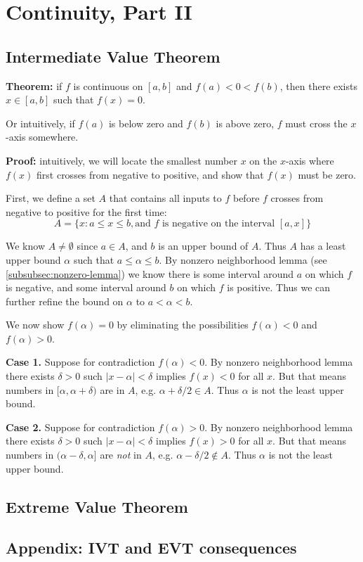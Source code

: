 \section{Continuity, Part II}

\subsection{Intermediate Value Theorem}\label{ivt}
\textbf{Theorem:} if $f$ is continuous on $[a,b]$ and $f(a)<0<f(b)$,
then there exists $x\in[a,b]$ such that $f(x)=0$.

\vs

Or intuitively, if $f(a)$ is below zero and $f(b)$ is above zero, $f$
must cross the $x$-axis somewhere.

\vs

\textbf{Proof:} intuitively, we will locate the smallest number $x$ on
the $x$-axis where $f(x)$ first crosses from negative to positive, and
show that $f(x)$ must be zero.

\vs

First, we define a set $A$ that contains all inputs to $f$ before $f$
crosses from negative to positive for the first time:
\[A=\{x:a\leq x\leq b, \text{and $f$ is negative on the interval
    $[a,x]$}\}\]

We know $A\neq\emptyset$ since $a\in A$, and $b$ is an upper bound of
$A$. Thus $A$ has a least upper bound $\alpha$ such that
$a\leq\alpha\leq b$. By nonzero neighborhood lemma (see
\ref{subsubsec:nonzero-lemma}) we know there is some interval around
$a$ on which $f$ is negative, and some interval around $b$ on which
$f$ is positive. Thus we can further refine the bound on $\alpha$ to
$a<\alpha<b$.

\vs

We now show $f(\alpha)=0$ by eliminating the possibilities
$f(\alpha)<0$ and $f(\alpha)>0$.

\vs

\textbf{Case 1.} Suppose for contradiction $f(\alpha)<0$. By nonzero
neighborhood lemma there exists $\delta>0$ such $|x-\alpha|<\delta$ implies
$f(x)<0$ for all $x$. But that means numbers in $[\alpha, \alpha+\delta)$ are in $A$,
e.g. $\alpha+\delta/2\in A$. Thus $\alpha$ is not the least upper bound.

\vs


\textbf{Case 2.} Suppose for contradiction $f(\alpha)>0$. By nonzero
neighborhood lemma there exists $\delta>0$ such $|x-\alpha|<\delta$ implies
$f(x)>0$ for all $x$. But that means numbers in
$(\alpha-\delta, \alpha]$ are \textit{not} in $A$, e.g.
$\alpha-\delta/2\notin A$. Thus $\alpha$ is not the least upper bound.


\subsection{Extreme Value Theorem}
\subsection{Appendix: IVT and EVT consequences}

